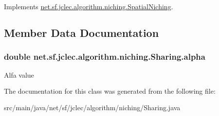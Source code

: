 Implements \hyperlink{classnet_1_1sf_1_1jclec_1_1algorithm_1_1niching_1_1_spatial_niching_aa0d6ea4c17a680c3beab861e17232af1}{net.\-sf.\-jclec.\-algorithm.\-niching.\-Spatial\-Niching}.



\subsection{Member Data Documentation}
\hypertarget{classnet_1_1sf_1_1jclec_1_1algorithm_1_1niching_1_1_sharing_a5de08d6f6de8d49b18acb235a9fb0c19}{
\subsubsection[{alpha}]{\setlength{\rightskip}{0pt plus 5cm}double net.\-sf.\-jclec.\-algorithm.\-niching.\-Sharing.\-alpha\hspace{0.3cm}{\ttfamily [protected]}}}\label{classnet_1_1sf_1_1jclec_1_1algorithm_1_1niching_1_1_sharing_a5de08d6f6de8d49b18acb235a9fb0c19}
Alfa value 

The documentation for this class was generated from the following file\-:\begin{DoxyCompactItemize}
\item 
src/main/java/net/sf/jclec/algorithm/niching/Sharing.\-java\end{DoxyCompactItemize}

